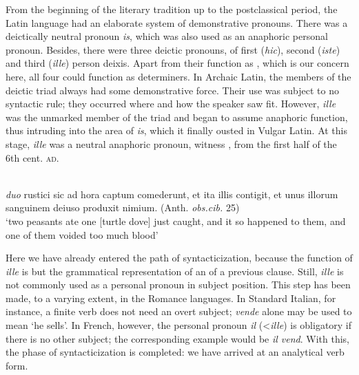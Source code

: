 From the beginning of the literary tradition up to the postclassical period, the Latin language had an elaborate system of demonstrative pronouns. There was a deictically neutral pronoun \textit{is}, which was also used as an anaphoric personal pronoun. Besides, there were three deictic pronouns, of first (\textit{hic}), second (\textit{iste}) and third (\textit{ille}) person deixis. Apart from their function as \nps, which is our concern here, all four could function as determiners. In Archaic Latin, the members of the deictic triad always had some demonstrative force. Their use was subject to no syntactic rule; they occurred where and how the speaker saw fit. However, \textit{ille} was the unmarked member of the triad and began to assume anaphoric function, thus intruding into the area of \textit{is}, which it finally ousted in Vulgar Latin. At this stage, \textit{ille} was a neutral anaphoric pronoun, witness , from the first half of the 6th cent. \textsc{ad}.

\ea\label{ex:E1}
 \\
\textit{duo} rustici sic ad hora captum comederunt, et ita illis contigit, et unus illorum sanguinem deiuso produxit nimium.  (Anth. \textit{obs.cib.} 25)\\
\glt ‘two peasants ate one [turtle dove] just caught, and it so happened to them, and one of them voided too much blood’ \\
\z

\noindent Here we have already entered the path of syntacticization, because the function of \textit{ille} is but the grammatical representation of an \np of a previous clause. Still, \textit{ille} is not commonly used as a personal pronoun in subject position. This step has been made, to a varying extent, in the Romance languages. In Standard Italian, for instance, a finite verb does not need an overt subject; \textit{vende} alone may be used to mean ‘he sells’. In French, however, the personal pronoun \textit{il} ({\textless}\textit{ille}) is obligatory if there is no other subject; the corresponding example would be \textit{il vend}. With this, the phase of syntacticization is completed: we have arrived at an analytical verb form.

